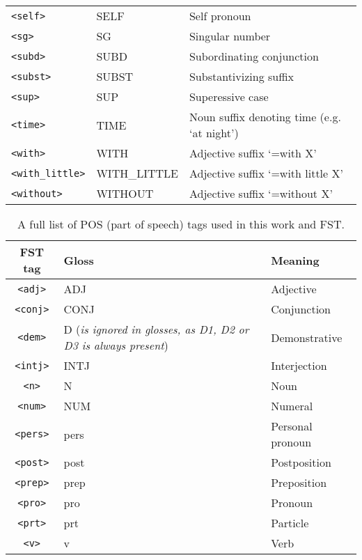 \begin{table}[!h]
\begin{center}
\begin{tabular}{|p{4cm}|p{3cm}|p{8.5cm}|}
            \texttt{<self>} & SELF & Self pronoun\\
            \texttt{<sg>} & SG & Singular number\\
            \texttt{<subd>} & SUBD & Subordinating conjunction\\
            \texttt{<subst>} & SUBST & Substantivizing suffix\\
            \texttt{<sup>} & SUP & Superessive case\\
            \texttt{<time>} & TIME & Noun suffix denoting time (e.g. `at night')\\
            \texttt{<with>} & WITH & Adjective suffix `=with X'\\
            \texttt{<with\_little>} & WITH\_LITTLE & Adjective suffix `=with little X'\\
            \texttt{<without>} & WITHOUT & Adjective suffix `=without X'\\
            \hline
        \end{tabular}
    \end{center}
\end{table}

\begin{table}[!h]
    \begin{center}
        \caption{A full list of POS (part of speech) tags used in this work and FST.}
        \label{Tab:pos_tags}
        \begin{tabular}{|c|l|l|}
            \hline
            \textbf{FST tag} & \textbf{Gloss} & \textbf{Meaning} \\
            \hline
            \hline
            \texttt{<adj>} & ADJ & Adjective\\
            \texttt{<conj>} & CONJ & Conjunction\\
            \texttt{<dem>} & D (\textit{is ignored in glosses, as D1, D2 or D3 is always present}) & Demonstrative\\
            \texttt{<intj>} & INTJ & Interjection\\
            \texttt{<n>} & N & Noun\\
            \texttt{<num>} & NUM & Numeral\\
            \texttt{<pers>} & pers & Personal pronoun\\
            \texttt{<post>} & post & Postposition\\
            \texttt{<prep>} & prep & Preposition\\
            \texttt{<pro>} & pro & Pronoun\\
            \texttt{<prt>} & prt & Particle\\
            \texttt{<v>} & v & Verb\\
            \hline
        \end{tabular}
    \end{center}
\end{table}

\newpage